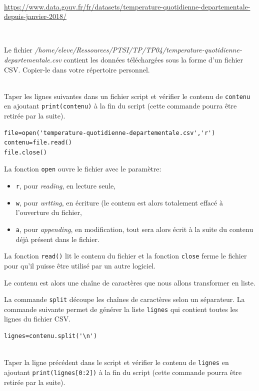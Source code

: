 ~\

\url{https://www.data.gouv.fr/fr/datasets/temperature-quotidienne-departementale-depuis-janvier-2018/}

~\

Le fichier \textit{/home/eleve/Ressources/PTSI/TP/TP04/temperature-quotidienne-departementale.csv} contient les données téléchargées sous la forme d'un fichier CSV. Copier-le dans votre répertoire personnel.

\begin{exercice}~\\
Taper les lignes suivantes dans un fichier script et vérifier le contenu de \verb?contenu? en ajoutant \verb?print(contenu)? à la fin du script (cette commande pourra être retirée par la suite).
\end{exercice}

\begin{verbatim}
file=open('temperature-quotidienne-departementale.csv','r')
contenu=file.read()
file.close()
\end{verbatim}

La fonction \verb?open? ouvre le fichier avec le paramètre:
\begin{itemize}
\item \verb?r?, pour \textit{reading}, en lecture seule,
\item \verb?w?, pour \textit{wrtting}, en écriture (le contenu est alors totalement effacé à l'ouverture du fichier,
\item \verb?a?, pour \textit{appending}, en modification, tout sera alors écrit à la suite du contenu déjà présent dans le fichier.
\end{itemize}

La fonction \verb?read()? lit le contenu du fichier et la fonction \verb?close? ferme le fichier pour qu'il puisse être utilisé par un autre logiciel.

Le contenu est alors une chaîne de caractères que nous allons transformer en liste.

La commande \verb?split? découpe les chaînes de caractères selon un séparateur. La commande suivante permet de générer la liste \verb?lignes? qui contient toutes les lignes du fichier CSV.

\begin{verbatim}
lignes=contenu.split('\n')
\end{verbatim}

\begin{exercice}~\\
Taper la ligne précédent dans le script et vérifier le contenu de \verb?lignes? en ajoutant \verb?print(lignes[0:2])? à la fin du script (cette commande pourra être retirée par la suite).
\end{exercice}

